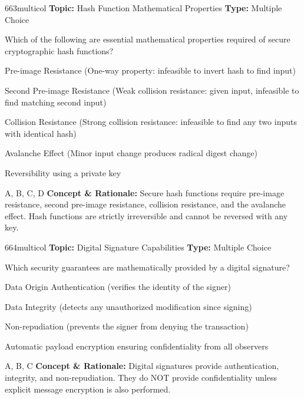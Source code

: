 \begin{qcard}{663}{multicol}
\textcolor{darkslate!75}{\small\textbf{Topic:} Hash Function Mathematical Properties \hfill \textbf{Type:} Multiple Choice}\vspace{0.4em}\par
Which of the following are essential mathematical properties required of secure cryptographic hash functions?
\begin{qoptions}
\item Pre-image Resistance (One-way property: infeasible to invert hash to find input)
\item Second Pre-image Resistance (Weak collision resistance: given input, infeasible to find matching second input)
\item Collision Resistance (Strong collision resistance: infeasible to find any two inputs with identical hash)
\item Avalanche Effect (Minor input change produces radical digest change)
\item Reversibility using a private key
\end{qoptions}
\end{qcard}
\nopagebreak
\begin{explainbox}{A, B, C, D}
\textbf{Concept \& Rationale:} Secure hash functions require pre-image resistance, second pre-image resistance, collision resistance, and the avalanche effect. Hash functions are strictly irreversible and cannot be reversed with any key.
\end{explainbox}

\begin{qcard}{664}{multicol}
\textcolor{darkslate!75}{\small\textbf{Topic:} Digital Signature Capabilities \hfill \textbf{Type:} Multiple Choice}\vspace{0.4em}\par
Which security guarantees are mathematically provided by a digital signature?
\begin{qoptions}
\item Data Origin Authentication (verifies the identity of the signer)
\item Data Integrity (detects any unauthorized modification since signing)
\item Non-repudiation (prevents the signer from denying the transaction)
\item Automatic payload encryption ensuring confidentiality from all observers
\end{qoptions}
\end{qcard}
\nopagebreak
\begin{explainbox}{A, B, C}
\textbf{Concept \& Rationale:} Digital signatures provide authentication, integrity, and non-repudiation. They do NOT provide confidentiality unless explicit message encryption is also performed.
\end{explainbox}

